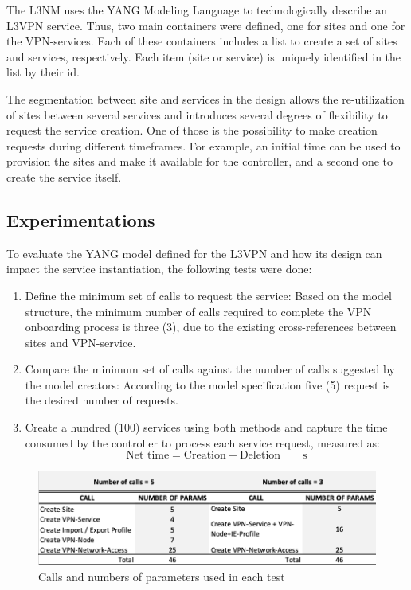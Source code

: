 \documentclass[conference]{IEEEtran}
\begin{document}
The L3NM uses the YANG Modeling Language to technologically describe an L3VPN service. Thus, two main containers were defined, one for sites and one for the VPN-services. Each of these containers includes a list to create a set of sites and services, respectively. Each item (site or service) is uniquely identified in the list by their id.

The segmentation between site and services in the design allows the re-utilization of sites between several services and introduces several degrees of flexibility to request the service creation. One of those is the possibility to make creation requests during different timeframes. For example, an initial time can be used to provision the sites and make it available for the controller, and a second one to create the service itself.

\subsection{Experimentations}
To evaluate the YANG model defined for the L3VPN and how its design can impact the service instantiation, the following tests were done:
\begin{enumerate}
    \item Define the minimum set of calls to request the service: Based on the model structure, the minimum number of calls required to complete the VPN onboarding process is three (3), due to the existing cross-references between sites and VPN-service.
    \item Compare the minimum set of calls against the number of calls suggested by the model creators: According to the model specification five (5) request is the desired number of requests. 
    \item Create a hundred (100) services using both methods and capture the time consumed by the controller to process each service request, measured as:
    \begin{equation}
         \si{\textrm{Net time}= \textrm{Creation} + \textrm{Deletion}\qquad \second}
    \end{equation}
\end{enumerate}

\begin{figure}
	\centering
		\includegraphics[scale=1]{figure4.png}
	\caption{Calls and numbers of parameters used in each test}
	\label{FIG:4}
\end{figure}
\end{document}
